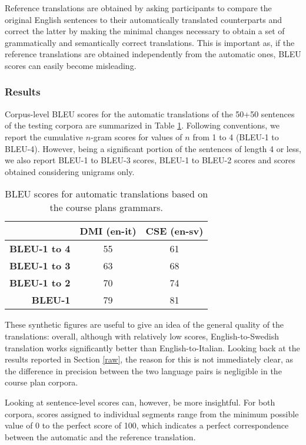 \documentclass[11pt]{article}
\begin{document}
Reference translations are obtained by asking participants to compare the original English sentences to their automatically translated counterparts and correct the latter by making the minimal changes necessary to obtain a set of grammatically and semantically correct translations. 
This is important as, if the reference translations are obtained independently from the automatic ones, BLEU scores can easily become misleading.

\subsubsection{Results} 
Corpus-level BLEU scores for the automatic translations of the 50+50 sentences of the testing corpora are summarized in Table \ref{tableu}. 
Following conventions, we report the cumulative $n$-gram scores for values of $n$ from 1 to 4 (BLEU-1 to BLEU-4). 
However, being a significant portion of the sentences of length 4 or less, we also report BLEU-1 to BLEU-3 scores, BLEU-1 to BLEU-2 scores and scores obtained considering unigrams only. 

\begin{table}[h]
  \centering
  \small
  \begin{tabular}{r|cc}
  \textbf{}            & \textbf{DMI (en-it)} & \textbf{CSE (en-sv)} \\ \hline
  \textbf{BLEU-1 to 4} & 55         & 61         \\ 
  \textbf{BLEU-1 to 3} & 63         & 68         \\ 
  \textbf{BLEU-1 to 2} & 70         & 74          \\
  \textbf{BLEU-1}      & 79         & 81         \\ 
  \end{tabular}
  \caption[BLEU scores for automatic translations based on the course plans grammars]{BLEU scores for automatic translations based on the course plans grammars.}
  \label{tableu}
\end{table}

These synthetic figures are useful to give an idea of the general quality of the translations: overall, although with relatively low scores, English-to-Swedish translation works significantly better than English-to-Italian. 
Looking back at the results reported in Section \ref{raw}, the reason for this is not immediately clear, as the difference in precision between the two language pairs is negligible in the course plan corpora.

Looking at sentence-level scores can, however, be more insightful. 
For both corpora, scores assigned to individual segments range from the minimum possible value of 0 to the perfect score of 100, which indicates a perfect correspondence between the automatic and the reference translation.
\end{document}
